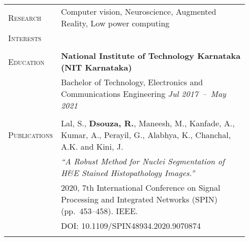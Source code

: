 \documentclass[letterpaper, 10pt, oneside]{article}
\newcommand{\stitle}[1]{\normalsize{\textsc{#1}}}
\begin{document}
\noindent \begin{longtable}{@{} p{0.14\linewidth} p{0.8\linewidth}}
\stitle{Research}  & Computer vision, Neuroscience, Augmented Reality, Low power computing \\
\stitle{Interests} & \\
\\


\stitle{Education} & \textbf{National Institute of Technology Karnataka (NIT Karnataka)} \\
                   & Bachelor of Technology, Electronics and Communications Engineering \hfill \hspace{-3em} \textit{Jul 2017\ --\ May 2021}\\
\\


\stitle{Publications} & Lal, S., \textbf{Dsouza, R.}, Maneesh, M., Kanfade, A., Kumar, A., Perayil, G., Alabhya, K., Chanchal, A.K. and Kini, J. \\
                      & \textit{``A Robust Method for Nuclei Segmentation of H\&E Stained Histopathology Images.''} \\
                      & 2020, 7th International Conference on Signal Processing and Integrated Networks (SPIN) (pp.~453--458)\@. IEEE\@.  \\
                      & \textcolor{dark-purple}{DOI\@: 10.1109/SPIN48934.2020.9070874} \\
\\



\end{longtable}
\end{document}
